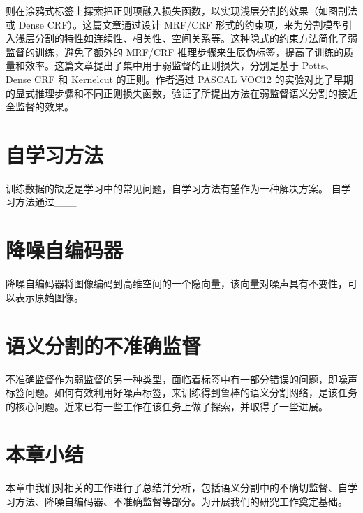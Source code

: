 \citet{tang2018regularized}则在涂鸦式标签上探索把正则项融入损失函数，以实现浅层分割的效果（如图割法或 Dense CRF）。这篇文章通过设计 MRF/CRF 形式的约束项，来为分割模型引入浅层分割的特性如连续性、相关性、空间关系等。这种隐式的约束方法简化了弱监督的训练，避免了额外的 MRF/CRF 推理步骤来生辰伪标签，提高了训练的质量和效率。这篇文章提出了集中用于弱监督的正则损失，分别是基于 Potts、Dense CRF 和 Kernelcut 的正则。作者通过 PASCAL VOC12 的实验对比了早期的显式推理步骤和不同正则损失函数，验证了所提出方法在弱监督语义分割的接近全监督的效果。


\section{自学习方法}
训练数据的缺乏是学习中的常见问题，自学习方法有望作为一种解决方案。
自学习方法通过___

\citet{Raina}


\citet{Li}


\citet{Bazzani}



\section{降噪自编码器}
降噪自编码器将图像编码到高维空间的一个隐向量，该向量对噪声具有不变性，可以表示原始图像。

\citet{Vincent}


\citet{Sundermeyer}



\section{语义分割的不准确监督}
不准确监督作为弱监督的另一种类型，面临着标签中有一部分错误的问题，即噪声标签问题。如何有效利用好噪声标签，来训练得到鲁棒的语义分割网络，是该任务的核心问题。近来已有一些工作在该任务上做了探索，并取得了一些进展。

\citet{Zhu}


\citet{Xue}


\citet{CL}


\citet{Tri-network}
 


\section{本章小结}
本章中我们对相关的工作进行了总结并分析，包括语义分割中的不确切监督、自学习方法、降噪自编码器、不准确监督等部分。为开展我们的研究工作奠定基础。

